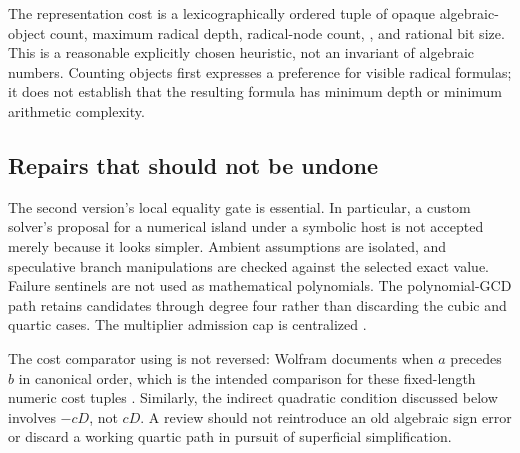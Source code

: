 \documentclass[11pt,letterpaper]{article}
\numberwithin{equation}{section}
\theoremstyle{definition}\newtheorem{definition}[theorem]{Definition}
\theoremstyle{remark}\newtheorem{remark}[theorem]{Remark}
\newcommand{\code}[1]{\texttt{\detokenize{#1}}}
\begin{document}
The representation cost is a lexicographically ordered tuple of opaque algebraic-object count, maximum radical depth, radical-node count, \code{LeafCount}, and rational bit size. This is a reasonable explicitly chosen heuristic, not an invariant of algebraic numbers. Counting \code{Root} objects first expresses a preference for visible radical formulas; it does not establish that the resulting formula has minimum depth or minimum arithmetic complexity.

\subsection{Repairs that should not be undone}
The second version's local equality gate is essential. In particular, a custom solver's proposal for a numerical island under a symbolic host is not accepted merely because it looks simpler. Ambient assumptions are isolated, and speculative branch manipulations are checked against the selected exact value. Failure sentinels are not used as mathematical polynomials. The polynomial-GCD path retains candidates through degree four rather than discarding the cubic and quartic cases. The multiplier admission cap is centralized \cite{source,prior}.

The cost comparator using \code{Order} is not reversed: Wolfram documents \code{Order[a,b]==1} when $a$ precedes $b$ in canonical order, which is the intended comparison for these fixed-length numeric cost tuples \cite{wl-order}. Similarly, the indirect quadratic condition discussed below involves $-cD$, not $cD$. A review should not reintroduce an old algebraic sign error or discard a working quartic path in pursuit of superficial simplification.
\end{document}
